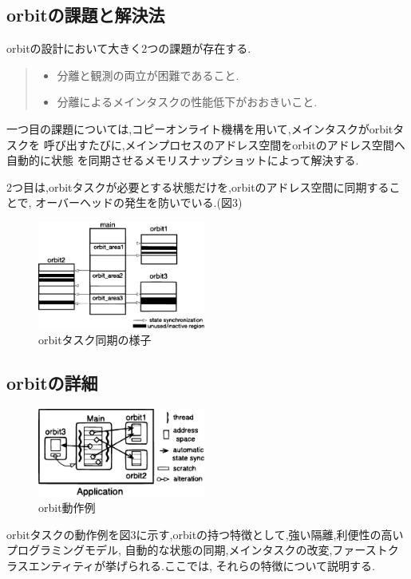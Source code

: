 \documentclass[submit,techreq,noauthor]{eco}	%
\begin{document}
\subsection{orbitの課題と解決法}
orbitの設計において大きく2つの課題が存在する.
\begin{quote}
  \begin{itemize}
   \item 分離と観測の両立が困難であること.
   \item 分離によるメインタスクの性能低下がおおきいこと.
  \end{itemize}
\end{quote}

一つ目の課題については,コピーオンライト機構を用いて,メインタスクがorbitタスクを
呼び出すたびに,メインプロセスのアドレス空間をorbitのアドレス空間へ自動的に状態
を同期させるメモリスナップショットによって解決する.

2つ目は,orbitタスクが必要とする状態だけを,orbitのアドレス空間に同期することで,
オーバーヘッドの発生を防いでいる.(図3)

\begin{figure}[H]
  \centering
  \includegraphics[width=5.5cm]{fig/pic2.eps}
  \caption{orbitタスク同期の様子}
\end{figure}

\subsection{orbitの詳細}

\begin{figure}[H]
  \centering
  \includegraphics[width=5.5cm]{fig/pic3.eps}
  \caption{orbit動作例}
\end{figure}

orbitタスクの動作例を図3に示す,orbitの持つ特徴として,強い隔離,利便性の高いプログラミングモデル,
自動的な状態の同期,メインタスクの改変,ファーストクラスエンティティが挙げられる.ここでは,
それらの特徴について説明する.
\end{document}
